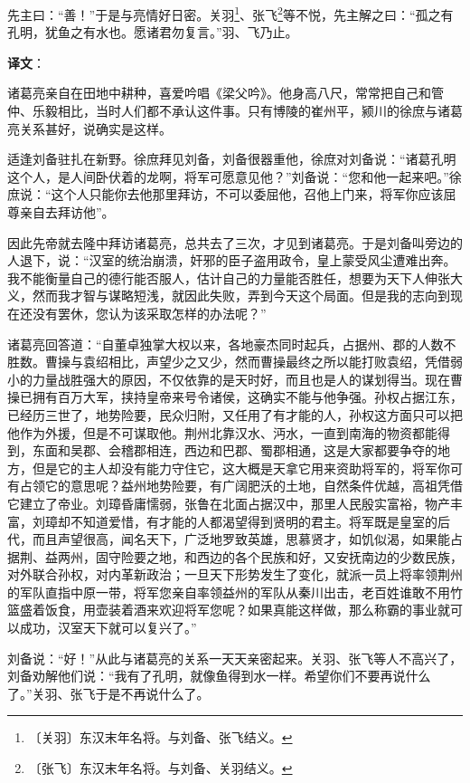 \documentclass[12pt,UTF-8,openany]{ctexbook}
\begin{document}
\begin{normalsize}
    先主曰：“善！”于是与亮情好日密。关羽\footnote{〔关羽〕东汉末年名将。与刘备、张飞结义。}、张飞\footnote{〔张飞〕东汉末年名将。与刘备、关羽结义。}等不悦，先主解之曰：“孤之有孔明，犹鱼之有水也。愿诸君勿复言。”羽、飞乃止。
\end{normalsize}


\newpage

\textbf{译文}：

\vspace{1em}

\begin{normalsize}
    
    诸葛亮亲自在田地中耕种，喜爱吟唱《梁父吟》。他身高八尺，常常把自己和管仲、乐毅相比，当时人们都不承认这件事。只有博陵的崔州平，颍川的徐庶与诸葛亮关系甚好，说确实是这样。
    
    适逢刘备驻扎在新野。徐庶拜见刘备，刘备很器重他，徐庶对刘备说：“诸葛孔明这个人，是人间卧伏着的龙啊，将军可愿意见他？”刘备说：“您和他一起来吧。”徐庶说：“这个人只能你去他那里拜访，不可以委屈他，召他上门来，将军你应该屈尊亲自去拜访他”。
    
    因此先帝就去隆中拜访诸葛亮，总共去了三次，才见到诸葛亮。于是刘备叫旁边的人退下，说：“汉室的统治崩溃，奸邪的臣子盗用政令，皇上蒙受风尘遭难出奔。我不能衡量自己的德行能否服人，估计自己的力量能否胜任，想要为天下人伸张大义，然而我才智与谋略短浅，就因此失败，弄到今天这个局面。但是我的志向到现在还没有罢休，您认为该采取怎样的办法呢？”
    
    诸葛亮回答道：“自董卓独掌大权以来，各地豪杰同时起兵，占据州、郡的人数不胜数。曹操与袁绍相比，声望少之又少，然而曹操最终之所以能打败袁绍，凭借弱小的力量战胜强大的原因，不仅依靠的是天时好，而且也是人的谋划得当。现在曹操已拥有百万大军，挟持皇帝来号令诸侯，这确实不能与他争强。孙权占据江东，已经历三世了，地势险要，民众归附，又任用了有才能的人，孙权这方面只可以把他作为外援，但是不可谋取他。荆州北靠汉水、沔水，一直到南海的物资都能得到，东面和吴郡、会稽郡相连，西边和巴郡、蜀郡相通，这是大家都要争夺的地方，但是它的主人却没有能力守住它，这大概是天拿它用来资助将军的，将军你可有占领它的意思呢？益州地势险要，有广阔肥沃的土地，自然条件优越，高祖凭借它建立了帝业。刘璋昏庸懦弱，张鲁在北面占据汉中，那里人民殷实富裕，物产丰富，刘璋却不知道爱惜，有才能的人都渴望得到贤明的君主。将军既是皇室的后代，而且声望很高，闻名天下，广泛地罗致英雄，思慕贤才，如饥似渴，如果能占据荆、益两州，固守险要之地，和西边的各个民族和好，又安抚南边的少数民族，对外联合孙权，对内革新政治；一旦天下形势发生了变化，就派一员上将率领荆州的军队直指中原一带，将军您亲自率领益州的军队从秦川出击，老百姓谁敢不用竹篮盛着饭食，用壶装着酒来欢迎将军您呢？如果真能这样做，那么称霸的事业就可以成功，汉室天下就可以复兴了。”
    
    刘备说：“好！”从此与诸葛亮的关系一天天亲密起来。关羽、张飞等人不高兴了，刘备劝解他们说：“我有了孔明，就像鱼得到水一样。希望你们不要再说什么了。”关羽、张飞于是不再说什么了。
    
\end{normalsize}
\end{document}
